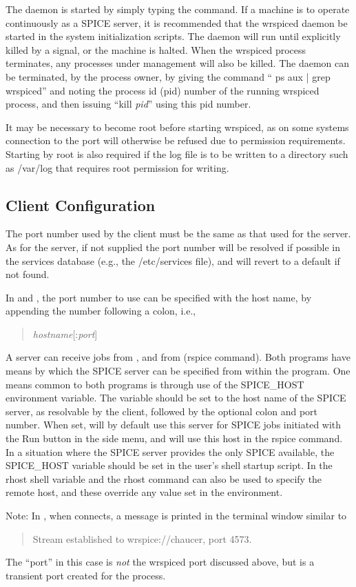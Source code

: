 The daemon is started by simply typing the command.  If a machine is
to operate continuously as a SPICE server, it is recommended that the
{\vt wrspiced} daemon be started in the system initialization scripts. 
The daemon will run until explicitly killed by a signal, or the
machine is halted.  When the {\vt wrspiced} process terminates, any
{\WRspice} processes under management will also be killed.  The daemon
can be terminated, by the process owner, by giving the command ``{\vt
ps aux | grep wrspiced}'' and noting the process id (pid) number of
the running {\vt wrspiced} process, and then issuing ``{\vt kill} {\it
pid\/}'' using this pid number.

It may be necessary to become root before starting {\vt wrspiced}, as
on some systems connection to the port will otherwise be refused due
to permission requirements.  Starting by root is also required if the
log file is to be written to a directory such as {\vt /var/log} that
requires root permission for writing.

\subsection{Client Configuration}

The port number used by the client must be the same as that used for
the server.  As for the server, if not supplied the port number will
be resolved if possible in the services database (e.g., the {\vt
/etc/services} file), and will revert to a default if not found.

In {\Xic} and {\WRspice}, the port number to use can be specified with
the host name, by appending the number following a colon, i.e.,
\begin{quote}
{\it hostname\/}[:{\it port\/}]
\end{quote}

A {\WRspice} server can receive jobs from {\Xic}, and from {\WRspice}
({\cb rspice} command).  Both programs have means by which the SPICE
server can be specified from within the program.  One means common to
both programs is through use of the {\et SPICE\_HOST} environment
variable.  The variable should be set to the host name of the SPICE
server, as resolvable by the client, followed by the optional colon
and port number.  When set, {\Xic} will by default use this server for
SPICE jobs initiated with the {\cb Run} button in the side menu, and
{\WRspice} will use this host in the {\et rspice} command.  In a
situation where the SPICE server provides the only SPICE available,
the {\et SPICE\_HOST} variable should be set in the user's shell
startup script.  In {\WRspice} the {\et rhost} shell variable and the
{\cb rhost} command can also be used to specify the remote host, and
these override any value set in the environment.

Note:  In {\Xic}, when {\WRspice} connects, a message is printed in
the terminal window similar to
\begin{quote}
{\vt Stream established to wrspice://chaucer, port 4573.}
\end{quote}
The ``port'' in this case is {\it not} the {\vt wrspiced} port
discussed above, but is a transient port created for the process.

